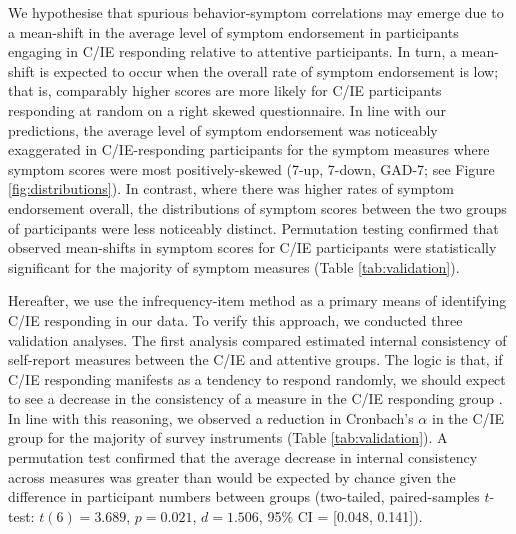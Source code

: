 \documentclass[a4paper,notitlepage,12pt]{article}
\begin{document}
\begin{refsection}[main]
We hypothesise that spurious behavior-symptom correlations may emerge due to a mean-shift in the average level of symptom endorsement in participants engaging in C/IE responding relative to attentive participants. In turn, a mean-shift is expected to occur when the overall rate of symptom endorsement is low; that is, comparably higher scores are more likely for C/IE participants responding at random on a right skewed questionnaire. In line with our predictions, the average level of symptom endorsement was noticeably exaggerated in C/IE-responding participants for the symptom measures where symptom scores were most positively-skewed (7-up, 7-down, GAD-7; see Figure \ref{fig:distributions}). In contrast, where there was higher rates of symptom endorsement overall, the distributions of symptom scores between the two groups of participants were less noticeably distinct. Permutation testing confirmed that observed mean-shifts in symptom scores for C/IE participants were statistically significant for the majority of symptom measures (Table \ref{tab:validation}).

Hereafter, we use the infrequency-item method as a primary means of identifying C/IE responding in our data. To verify this approach, we conducted three validation analyses. The first analysis compared estimated internal consistency of self-report measures between the C/IE and attentive groups. The logic is that, if C/IE responding manifests as a tendency to respond randomly, we should expect to see a decrease in the consistency of a measure in the C/IE responding group \cite{maniaci2014caring, desimone2018dirty, desimone2018differential}. In line with this reasoning, we observed a reduction in Cronbach's $\alpha$ in the C/IE group for the majority of survey instruments (Table \ref{tab:validation}). A permutation test confirmed that the average decrease in internal consistency across measures was greater than would be expected by chance given the difference in participant numbers between groups (two-tailed, paired-samples $t$-test: $t(6)=3.689$, $p=0.021$, $d=1.506$, 95\% CI = [0.048, 0.141]). 


\end{refsection}
\end{document}

